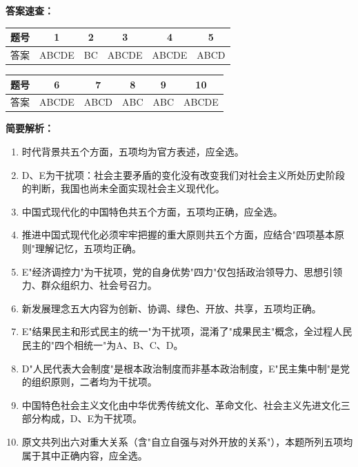 \documentclass[12pt, a4paper]{article}
\begin{document}
\begin{answerbox}

\textbf{答案速查：}

\begin{center}
\begin{tabular}{|c|c|c|c|c|c|}
\hline
题号 & 1 & 2 & 3 & 4 & 5 \\
\hline
答案 & ABCDE & BC & ABCDE & ABCDE & ABCD \\
\hline
\end{tabular}

\vspace{4pt}

\begin{tabular}{|c|c|c|c|c|c|}
\hline
题号 & 6 & 7 & 8 & 9 & 10 \\
\hline
答案 & ABCDE & ABCD & ABC & ABC & ABCDE \\
\hline
\end{tabular}
\end{center}

\vspace{8pt}
\textbf{简要解析：}

\begin{enumerate}[itemsep=2pt, topsep=4pt, leftmargin=1.6em]
\item 时代背景共五个方面，五项均为官方表述，应全选。
\item D、E为干扰项：社会主要矛盾的变化没有改变我们对社会主义所处历史阶段的判断，我国也尚未全面实现社会主义现代化。
\item 中国式现代化的中国特色共五个方面，五项均正确，应全选。
\item 推进中国式现代化必须牢牢把握的重大原则共五个方面，应结合"四项基本原则"理解记忆，五项均正确。
\item E"经济调控力"为干扰项，党的自身优势"四力"仅包括政治领导力、思想引领力、群众组织力、社会号召力。
\item 新发展理念五大内容为创新、协调、绿色、开放、共享，五项均正确。
\item E"结果民主和形式民主的统一"为干扰项，混淆了"成果民主"概念，全过程人民民主的"四个相统一"为A、B、C、D。
\item D"人民代表大会制度"是根本政治制度而非基本政治制度，E"民主集中制"是党的组织原则，二者均为干扰项。
\item 中国特色社会主义文化由中华优秀传统文化、革命文化、社会主义先进文化三部分构成，D、E为干扰项。
\item 原文共列出六对重大关系（含"自立自强与对外开放的关系"），本题所列五项均属于其中正确内容，应全选。
\end{enumerate}

\end{answerbox}
\end{document}
